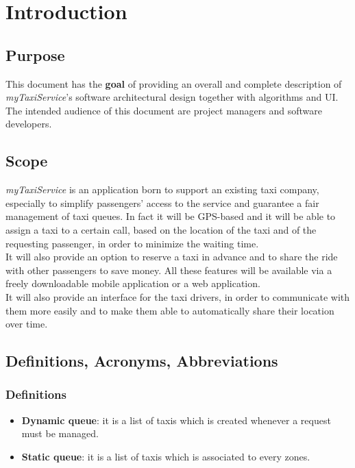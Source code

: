 
\section{Introduction}

\subsection{Purpose}
This document has the \textbf{goal} of providing an overall and complete description of \textit{myTaxiService}'s software architectural design together with algorithms and UI.\\
The intended audience of this document are project managers and software developers.

\subsection{Scope}
\textit{myTaxiService} is an application born to support an existing taxi company, especially to simplify passengers' access to the service and guarantee a fair management of taxi queues. In fact it will be GPS-based and it will be able to assign a taxi to a certain call, based on the location of the taxi and of the requesting passenger, in order to minimize the waiting time.\\
It will also provide an option to reserve a taxi in advance and to share the ride with other passengers to save money. All these features will be available via a freely downloadable mobile application or a web application.\\
It will also provide an interface for the taxi drivers, in order to communicate with them more easily and to make them able to automatically share their location over time.

\subsection{Definitions, Acronyms, Abbreviations}

\subsubsection{Definitions}
\begin{itemize}
\item \textbf{Dynamic queue}: it is a list of taxis which is created whenever a request must be managed.
\item \textbf{Static queue}: it is a list of taxis which is associated to every zones. 
\end{itemize}

